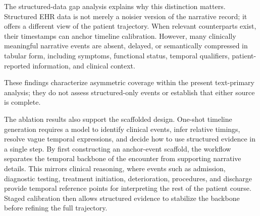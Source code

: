 \documentclass{ws-procs11x85}
\newif\ifshowrebuttalcolor
\newcommand{\rebuttal}[1]{%
  \ifshowrebuttalcolor
    \textcolor{rebuttalblue}{#1}%
  \else
    #1%
  \fi
}
\begin{document}

The structured-data gap analysis explains why this distinction matters. Structured EHR data is not merely a noisier version of the narrative record; it offers a different view of the patient trajectory. When relevant counterparts exist, their timestamps can anchor timeline calibration. However, many clinically meaningful narrative events are absent, delayed, or semantically compressed in tabular form, including symptoms, functional status, temporal qualifiers, patient-reported information, and clinical context. 
\rebuttal{These findings characterize
asymmetric coverage within the present text-primary analysis; they do not assess structured-only events or establish that either source is complete.}

The ablation results also support the scaffolded design. One-shot timeline generation requires a model to identify clinical events, infer relative timings, resolve vague temporal expressions, and decide how to use structured evidence in a single step. By first constructing an anchor-event scaffold, the workflow separates the temporal backbone of the encounter from supporting narrative details. This mirrors clinical reasoning, where events such as admission, diagnostic testing, treatment initiation, deterioration, procedures, and discharge provide temporal reference points for interpreting the rest of the patient course. Staged calibration then allows structured evidence to stabilize the backbone before refining the full trajectory.
\end{document}
